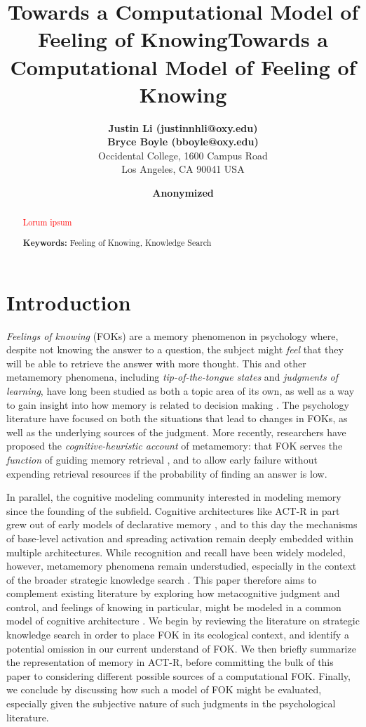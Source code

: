 \documentclass[10pt,letterpaper]{article}
\title{Towards a Computational Model of Feeling of Knowing}
\author{
        {\large \bf Justin Li (justinnhli@oxy.edu)} \\
        {\large \bf Bryce Boyle (bboyle@oxy.edu)} \\
        Occidental College, 1600 Campus Road \\
        Los Angeles, CA 90041 USA
    }
\title{Towards a Computational Model of Feeling of Knowing}
\author{
    {\large \bf Anonymized}
}
\newcommand{\fixme}[2][]{#2}
\renewcommand{\fixme}[2][]{\textcolor{red}{#2}}
\begin{document}
\maketitle

\begin{abstract}

    \fixme{Lorum ipsum}

    \textbf{Keywords:} Feeling of Knowing, Knowledge Search

\end{abstract}

\section{Introduction}

\emph{Feelings of knowing} (FOKs) are a memory phenomenon in psychology where, despite not knowing the answer to a question, the subject might \emph{feel} that they will be able to retrieve the answer with more thought.
This and other metamemory phenomena, including \emph{tip-of-the-tongue states} and \emph{judgments of learning}, have long been studied as both a topic area of its own, as well as a way to gain insight into how memory is related to decision making \cite{Nelson1994WhyInvestigateMetacognition}.
The psychology literature have focused on both the situations that lead to changes in FOKs, as well as the underlying sources of the judgment.
More recently, researchers have proposed the \emph{cognitive-heuristic account} of metamemory: that FOK serves the \emph{function} of guiding memory retrieval \cite{Schwartz2011TipOfThe}, and to allow early failure without expending retrieval resources if the probability of finding an answer is low.

In parallel, the cognitive modeling community interested in modeling memory since the founding of the subfield.
Cognitive architectures like ACT-R \cite{Anderson2007HowCanThe} in part grew out of early models of declarative memory \cite{Anderson1983ASpreadingActivation, Anderson1991ReflectionsOfThe}, and to this day the mechanisms of base-level activation and spreading activation remain deeply embedded within multiple architectures.
While recognition and recall have been widely modeled, however, metamemory phenomena remain understudied, especially in the context of the broader strategic knowledge search \cite{Newell1972HumanProblemSolving}.
This paper therefore aims to complement existing literature by exploring how metacognitive judgment and control, and feelings of knowing in particular, might be modeled in a common model of cognitive architecture \cite{Laird2017AStandardModel}.
We begin by reviewing the literature on strategic knowledge search in order to place FOK in its ecological context, and identify a potential omission in our current understand of FOK.
We then briefly summarize the representation of memory in ACT-R, before committing the bulk of this paper to considering different possible sources of a computational FOK.
Finally, we conclude by discussing how such a model of FOK might be evaluated, especially given the subjective nature of such judgments in the psychological literature.
\end{document}
